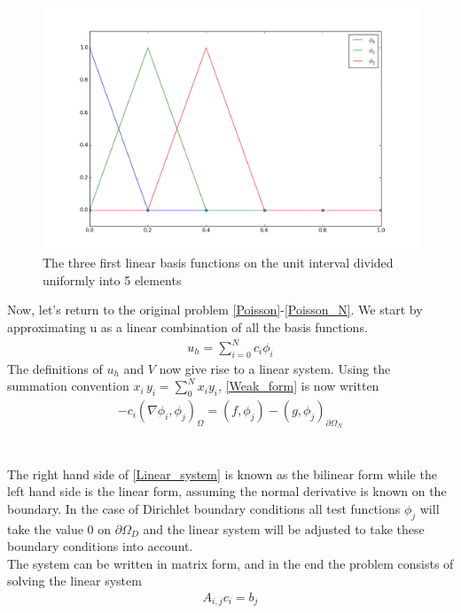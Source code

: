 \begin{figure}
  \begin{center}
    \includegraphics[scale=0.4]{figures/hats.png}
  \end{center}
	\caption{The three first linear basis functions on the unit interval divided uniformly into 5 elements}
\end{figure}
Now, let's return to the original problem \eqref{Poisson}-\eqref{Poisson_N}. We start by approximating u as a linear combination of all the basis functions. 
\begin{align}
u_h = \sum_{i=0}^N c_i \phi_i \label{u_hsum}
\end{align}
The definitions of $u_h$ and $V$ now give rise to a linear system. Using the summation convention $x_i\,y_i = \sum_0^N x_i y_i $, \eqref{Weak_form} is now written 
\begin{align}
-c_i(\nabla \phi_i, \phi_j)_\Omega = (f,\phi_j) - (g, \phi_j)_{\partial \Omega_N} \label{Linear_system}
\end{align}
\\
\\

The right hand side of \eqref{Linear_system} is known as the bilinear form while the left hand side is the linear form, assuming the normal derivative is known on the boundary. In the case of Dirichlet boundary conditions all test functions $\phi_j$ will take the value 0 on $\partial \Omega_D$ and the linear system will be adjusted to take these boundary conditions into account. \\
The system can be written in matrix form, and in the end the problem consists of solving the linear system
\begin{align} A_{i,j}c_i = b_j \label{Matrix_1} \end{align}
\\
\\
